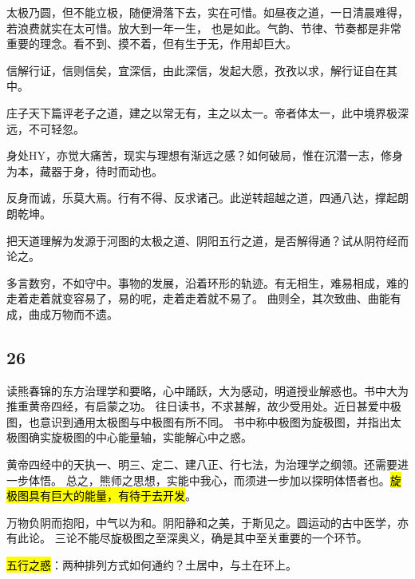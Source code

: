 太极乃圆，但不能立极，随便滑落下去，实在可惜。如昼夜之道，一日清晨难得，若浪费就实在太可惜。放大到一年一生，
也是如此。气韵、节律、节奏都是非常重要的理念。看不到、摸不着，但有生于无，作用却巨大。

信解行证，信则信矣，宜深信，由此深信，发起大愿，孜孜以求，解行证自在其中。

庄子天下篇评老子之道，建之以常无有，主之以太一。帝者体太一，此中境界极深远，不可轻忽。

身处HY，亦觉大痛苦，现实与理想有渐远之感？如何破局，惟在沉潜一志，修身为本，藏器于身，待时而动也。

反身而诚，乐莫大焉。行有不得、反求诸己。此逆转超越之道，四通八达，撑起朗朗乾坤。

把天道理解为发源于河图的太极之道、阴阳五行之道，是否解得通？试从阴符经而论之。

多言数穷，不如守中。事物的发展，沿着环形的轨迹。有无相生，难易相成，难的走着走着就变容易了，易的呢，走着走着就不易了。
曲则全，其次致曲、曲能有成，曲成万物而不遗。

\subsection{26}

读熊春锦的东方治理学和要略，心中踊跃，大为感动，明道授业解惑也。书中大为推重黄帝四经，有启蒙之功。
往日读书，不求甚解，故少受用处。近日甚爱中极图，也意识到通用太极图与中极图有所不同。
书中称中极图为旋极图，并指出太极图确实旋极图的中心能量轴，实能解心中之惑。

黄帝四经中的天执一、明三、定二、建八正、行七法，为治理学之纲领。还需要进一步体悟。
总之，熊师之思想，实能中我心，而须进一步加以探明体悟者也。\hl{旋极图具有巨大的能量，有待于去开发}。

万物负阴而抱阳，中气以为和。阴阳静和之美，于斯见之。圆运动的古中医学，亦有此论。
三论不能尽旋极图之至深奥义，确是其中至关重要的一个环节。

\hl{五行之惑}：两种排列方式如何通约？土居中，与土在环上。
